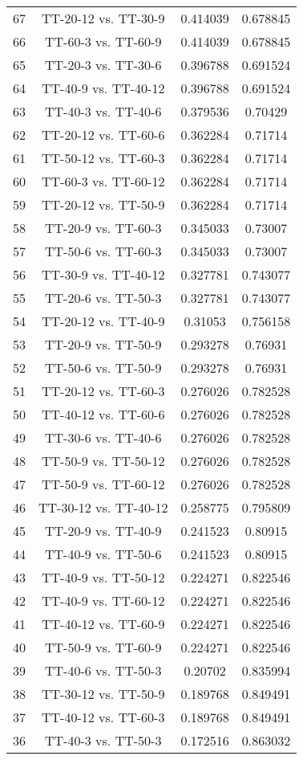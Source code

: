 \documentclass[a4paper,10pt]{article}
\begin{document}
\begin{landscape}
\begin{table}[!htp]
\begin{tabular}{cccc}
67&TT-20-12 vs. TT-30-9&0.414039&0.678845\\
66&TT-60-3 vs. TT-60-9&0.414039&0.678845\\
65&TT-20-3 vs. TT-30-6&0.396788&0.691524\\
64&TT-40-9 vs. TT-40-12&0.396788&0.691524\\
63&TT-40-3 vs. TT-40-6&0.379536&0.70429\\
62&TT-20-12 vs. TT-60-6&0.362284&0.71714\\
61&TT-50-12 vs. TT-60-3&0.362284&0.71714\\
60&TT-60-3 vs. TT-60-12&0.362284&0.71714\\
59&TT-20-12 vs. TT-50-9&0.362284&0.71714\\
58&TT-20-9 vs. TT-60-3&0.345033&0.73007\\
57&TT-50-6 vs. TT-60-3&0.345033&0.73007\\
56&TT-30-9 vs. TT-40-12&0.327781&0.743077\\
55&TT-20-6 vs. TT-50-3&0.327781&0.743077\\
54&TT-20-12 vs. TT-40-9&0.31053&0.756158\\
53&TT-20-9 vs. TT-50-9&0.293278&0.76931\\
52&TT-50-6 vs. TT-50-9&0.293278&0.76931\\
51&TT-20-12 vs. TT-60-3&0.276026&0.782528\\
50&TT-40-12 vs. TT-60-6&0.276026&0.782528\\
49&TT-30-6 vs. TT-40-6&0.276026&0.782528\\
48&TT-50-9 vs. TT-50-12&0.276026&0.782528\\
47&TT-50-9 vs. TT-60-12&0.276026&0.782528\\
46&TT-30-12 vs. TT-40-12&0.258775&0.795809\\
45&TT-20-9 vs. TT-40-9&0.241523&0.80915\\
44&TT-40-9 vs. TT-50-6&0.241523&0.80915\\
43&TT-40-9 vs. TT-50-12&0.224271&0.822546\\
42&TT-40-9 vs. TT-60-12&0.224271&0.822546\\
41&TT-40-12 vs. TT-60-9&0.224271&0.822546\\
40&TT-50-9 vs. TT-60-9&0.224271&0.822546\\
39&TT-40-6 vs. TT-50-3&0.20702&0.835994\\
38&TT-30-12 vs. TT-50-9&0.189768&0.849491\\
37&TT-40-12 vs. TT-60-3&0.189768&0.849491\\
36&TT-40-3 vs. TT-50-3&0.172516&0.863032\\

\end{tabular}
\end{table}
\end{landscape}
\end{document}
